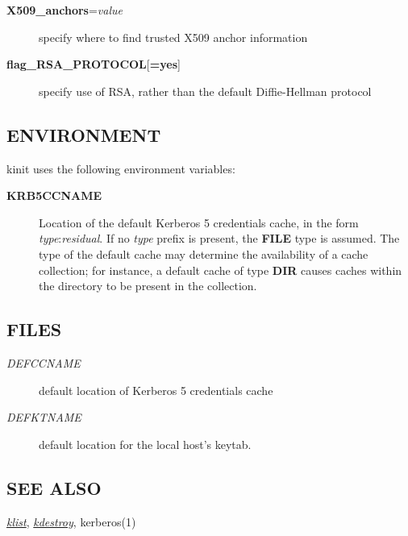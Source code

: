 \documentclass[letterpaper,10pt,english]{sphinxmanual}
\begin{document}
\begin{description}
\begin{description}
\item[{\textbf{X509\_anchors}=\emph{value}}] \leavevmode
specify where to find trusted X509 anchor information

\item[{\textbf{flag\_RSA\_PROTOCOL}{[}\textbf{=yes}{]}}] \leavevmode
specify use of RSA, rather than the default Diffie-Hellman
protocol

\end{description}

\end{description}


\subsection{ENVIRONMENT}
\label{user/user_commands/kinit:environment}
kinit uses the following environment variables:
\begin{description}
\item[{\textbf{KRB5CCNAME}}] \leavevmode
Location of the default Kerberos 5 credentials cache, in the form
\emph{type}:\emph{residual}.  If no \emph{type} prefix is present, the \textbf{FILE}
type is assumed.  The type of the default cache may determine the
availability of a cache collection; for instance, a default cache
of type \textbf{DIR} causes caches within the directory to be present
in the collection.

\end{description}


\subsection{FILES}
\label{user/user_commands/kinit:files}\begin{description}
\item[{\emph{DEFCCNAME}}] \leavevmode
default location of Kerberos 5 credentials cache

\item[{\emph{DEFKTNAME}}] \leavevmode
default location for the local host's keytab.

\end{description}


\subsection{SEE ALSO}
\label{user/user_commands/kinit:see-also}
{\hyperref[user/user_commands/klist:klist-1]{\emph{klist}}}, {\hyperref[user/user_commands/kdestroy:kdestroy-1]{\emph{kdestroy}}}, kerberos(1)
\end{document}
